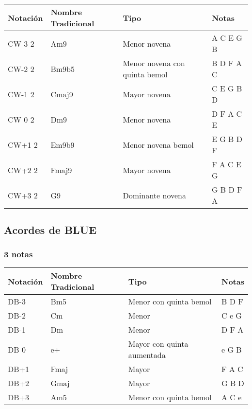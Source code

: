\documentclass[]{report}
\begin{document}
\begin{table}[H]
  \centering
  \begin{tabularx}{\textwidth}{ll>{\raggedright\arraybackslash}Xl}
\toprule
Notación & Nombre Tradicional & Tipo & Notas \\
\midrule
\textsf{CW-3} 2 & Am9     & Menor novena & A C E G B \\
\textsf{CW-2} 2 & Bm9b5   & Menor novena con quinta bemol & B D F A C \\
\textsf{CW-1} 2 & Cmaj9   & Mayor novena & C E G B D \\
\textsf{CW 0} 2 & Dm9     & Menor novena & D F A C E \\
\textsf{CW+1} 2 & Em9b9   & Menor novena bemol & E G B D F \\
\textsf{CW+2} 2 & Fmaj9   & Mayor novena & F A C E G \\
\textsf{CW+3} 2 & G9      & Dominante novena & G B D F A \\
\bottomrule
\end{tabularx}
\end{table}

\subsection*{Acordes de BLUE}

\subsubsection*{3 notas}

\begin{table}[H]
  \centering
  \begin{tabularx}{\textwidth}{ll>{\raggedright\arraybackslash}Xl}
\toprule
Notación & Nombre Tradicional & Tipo & Notas \\
\midrule
\textsf{DB-3} & Bm5     & Menor con quinta bemol & B D F \\
\textsf{DB-2} & Cm      & Menor & C e G \\
\textsf{DB-1} & Dm      & Menor & D F A \\
\textsf{DB 0} & e+      & Mayor con quinta aumentada & e G B \\
\textsf{DB+1} & Fmaj    & Mayor & F A C \\
\textsf{DB+2} & Gmaj    & Mayor & G B D \\
\textsf{DB+3} & Am5     & Menor con quinta bemol & A C e \\
\bottomrule
\end{tabularx}
\end{table}
\end{document}

